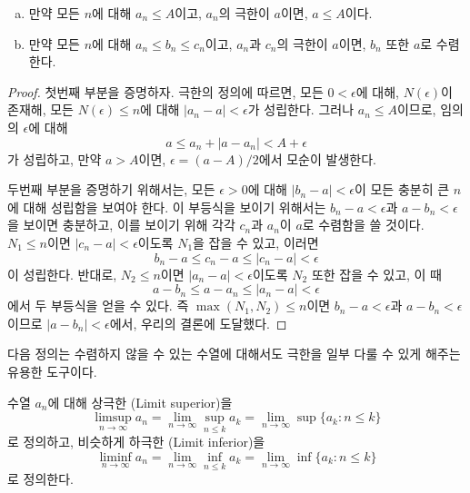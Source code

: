 \begin{theorem}
    \begin{enumerate}[(a)]
        \item 만약 모든 $n$에 대해 $a_n \leq A$이고, $a_n$의 극한이 $a$이면, $a \leq A$이다.
        \item 만약 모든 $n$에 대해 $a_n \leq b_n \leq c_n$이고, $a_n$과 $c_n$의 극한이 $a$이면, $b_n$ 또한 $a$로 수렴한다.  
    \end{enumerate}
\end{theorem}
\begin{proof}
    첫번째 부분을 증명하자.
    극한의 정의에 따르면, 모든 $0 < \epsilon$에 대해, $N(\epsilon)$이 존재해, 모든 $N(\epsilon) \leq n$에 대해 $|a_n - a| < \epsilon$가 성립한다.
    그러나 $a_n \leq A$이므로, 임의의 $\epsilon$에 대해
    \begin{equation*}
        a \leq a_n + |a - a_n| < A + \epsilon
    \end{equation*}
    가 성립하고, 만약 $a > A$이면, $\epsilon = (a - A)/2$에서 모순이 발생한다.

    두번째 부분을 증명하기 위해서는, 모든 $\epsilon > 0$에 대해 $|b_n - a| < \epsilon$이 모든 충분히 큰 $n$에 대해 성립함을 보여야 한다.
    이 부등식을 보이기 위해서는 $b_n - a < \epsilon$과 $a - b_n < \epsilon$을 보이면 충분하고, 이를 보이기 위해 각각 $c_n$과 $a_n$이 $a$로 수렴함을 쓸 것이다.
    $N_1 \leq n$이면 $|c_n - a| < \epsilon$이도록 $N_1$을 잡을 수 있고, 이러면 
    \begin{equation*}
        b_n - a \leq c_n - a \leq |c_n - a| < \epsilon
    \end{equation*}
    이 성립한다.
    반대로, $N_2 \leq n$이면 $|a_n - a| < \epsilon$이도록 $N_2$ 또한 잡을 수 있고, 이 때
    \begin{equation*}
        a - b_n \leq a - a_n \leq |a_n - a| < \epsilon
    \end{equation*}
    에서 두 부등식을 얻을 수 있다.
    즉 $\max(N_1, N_2) \leq n$이면 $b_n - a < \epsilon$과 $a - b_n < \epsilon$이므로 $|a - b_n| < \epsilon$에서, 우리의 결론에 도달했다.
\end{proof}

다음 정의는 수렴하지 않을 수 있는 수열에 대해서도 극한을 일부 다룰 수 있게 해주는 유용한 도구이다.
\begin{definition}
    수열 $a_n$에 대해 상극한 (Limit superior)을
    \begin{equation*}
        \limsup_{n \to \infty} a_n = \lim_{n \to \infty} \sup_{n \leq k} a_k = \lim_{n \to \infty} \sup \{a_k : n \leq k \}
    \end{equation*}
    로 정의하고, 비슷하게 하극한 (Limit inferior)을
    \begin{equation*}
        \liminf_{n \to \infty} a_n = \lim_{n \to \infty} \inf_{n \leq k} a_k = \lim_{n \to \infty} \inf \{a_k : n \leq k \}
    \end{equation*}
    로 정의한다.
\end{definition}

